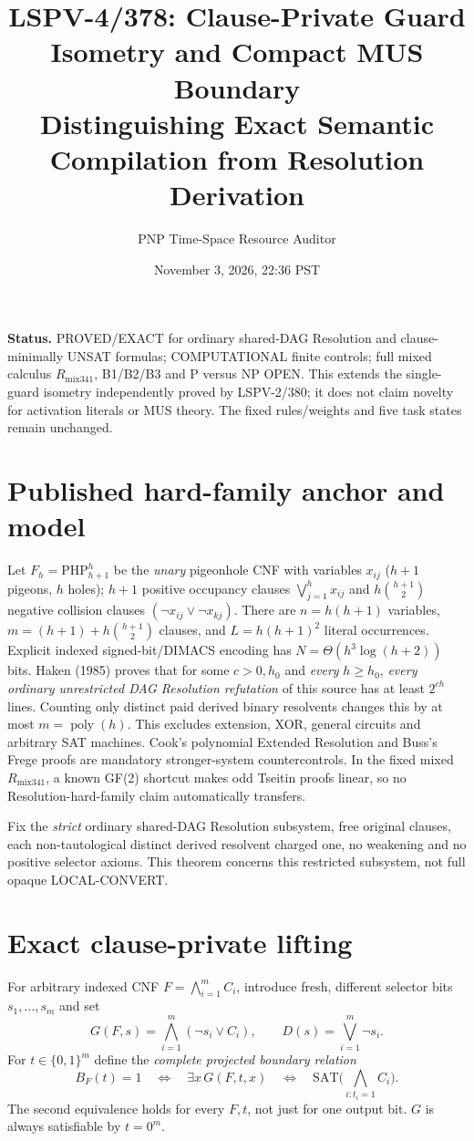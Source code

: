 \documentclass[11pt]{article}
\title{LSPV-4/378: Clause-Private Guard Isometry and Compact MUS Boundary\\Distinguishing Exact Semantic Compilation from Resolution Derivation}
\author{PNP Time-Space Resource Auditor}
\date{November 3, 2026, 22:36 PST}
\begin{document}
\maketitle
\noindent\textbf{Status.} PROVED/EXACT for ordinary shared-DAG Resolution and clause-minimally UNSAT formulas; COMPUTATIONAL finite controls; full mixed calculus $R_{\mathrm{mix341}}$, B1/B2/B3 and P versus NP OPEN. This extends the single-guard isometry independently proved by LSPV-2/380; it does not claim novelty for activation literals or MUS theory. The fixed rules/weights and five task states remain unchanged.

\section*{Published hard-family anchor and model}
Let $F_h=\mathrm{PHP}_{h+1}^h$ be the \emph{unary} pigeonhole CNF with variables $x_{ij}$ ($h+1$ pigeons, $h$ holes); $h+1$ positive occupancy clauses $\bigvee_{j=1}^h x_{ij}$ and $h\binom{h+1}{2}$ negative collision clauses $(\neg x_{ij}\vee\neg x_{kj})$. There are $n=h(h+1)$ variables, $m=(h+1)+h\binom{h+1}{2}$ clauses, and $L=h(h+1)^2$ literal occurrences. Explicit indexed signed-bit/DIMACS encoding has $N=\Theta(h^3\log(h+2))$ bits. Haken (1985) proves that for some $c>0,h_0$ and \emph{every} $h\ge h_0$, \emph{every ordinary unrestricted DAG Resolution refutation} of this source has at least $2^{ch}$ lines. Counting only distinct paid derived binary resolvents changes this by at most $m=\operatorname{poly}(h)$. This excludes extension, XOR, general circuits and arbitrary SAT machines. Cook's polynomial Extended Resolution and Buss's Frege proofs are mandatory stronger-system countercontrols. In the fixed mixed $R_{\mathrm{mix341}}$, a known GF(2) shortcut makes odd Tseitin proofs linear, so no Resolution-hard-family claim automatically transfers.

Fix the \emph{strict} ordinary shared-DAG Resolution subsystem, free original clauses, each non-tautological distinct derived resolvent charged one, no weakening and no positive selector axioms. This theorem concerns this restricted subsystem, not full opaque LOCAL-CONVERT.

\section*{Exact clause-private lifting}
For arbitrary indexed CNF $F=\bigwedge_{i=1}^m C_i$, introduce fresh, different selector bits $s_1,\ldots,s_m$ and set
\[
G(F,s)=\bigwedge_{i=1}^m(\neg s_i\vee C_i),\qquad D(s)=\bigvee_{i=1}^m\neg s_i.
\]
For $t\in\{0,1\}^m$ define the \emph{complete projected boundary relation}
\[
B_F(t)=1\quad\Longleftrightarrow\quad \exists x\,G(F,t,x)
\quad\Longleftrightarrow\quad
\mathrm{SAT}\Big(\bigwedge_{i:t_i=1}C_i\Big).
\]
The second equivalence holds for every $F,t$, not just for one output bit. $G$ is always satisfiable by $t=0^m$.
\end{document}
